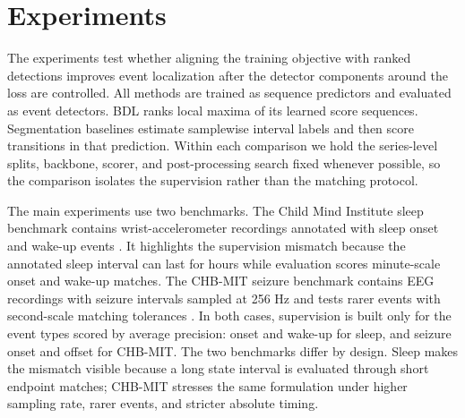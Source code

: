 \section{Experiments}
\label{sec:experiments}

The experiments test whether aligning the training objective with ranked detections improves event localization after the detector components around the loss are controlled.
All methods are trained as sequence predictors and evaluated as event detectors.
BDL ranks local maxima of its learned score sequences.
Segmentation baselines estimate samplewise interval labels and then score transitions in that prediction.
Within each comparison we hold the series-level splits, backbone, scorer, and post-processing search fixed whenever possible, so the comparison isolates the supervision rather than the matching protocol.

The main experiments use two benchmarks.
The Child Mind Institute sleep benchmark contains wrist-accelerometer recordings annotated with sleep onset and wake-up events \citep{alexander2017,migueles2019,robbins2019,esper2023}.
It highlights the supervision mismatch because the annotated sleep interval can last for hours while evaluation scores minute-scale onset and wake-up matches.
The CHB-MIT seizure benchmark contains EEG recordings with seizure intervals sampled at 256 Hz and tests rarer events with second-scale matching tolerances \citep{shoeb2010,goldberger2000,klem1999}.
In both cases, supervision is built only for the event types scored by average precision: onset and wake-up for sleep, and seizure onset and offset for CHB-MIT.
The two benchmarks differ by design.
Sleep makes the mismatch visible because a long state interval is evaluated through short endpoint matches; CHB-MIT stresses the same formulation under higher sampling rate, rarer events, and stricter absolute timing.

